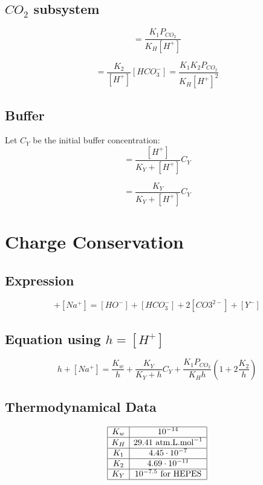 \documentclass[aps,12pt]{revtex4}
\begin{document}
\subsection{$CO_2$ subsystem}
\begin{equation}
[HCO_3^-] = \dfrac{K_1 P_{CO_2}}{K_H [H^+] } 
\end{equation}

\begin{equation}
[CO_3^{2-}] = \dfrac{K_2}{[H^+] }  [HCO_3^-]  = \dfrac{K_1 K_2 P_{CO_2}}{K_H [H^+]^2 } 
\end{equation}

\subsection{Buffer}
Let $C_Y$ be the initial buffer concentration:
\begin{equation}
	[HY] = \dfrac{[H^+]}{K_Y + [H^+]} C_Y
\end{equation}

\begin{equation}
	[Y^-] = \dfrac{K_Y}{K_Y + [H^+]} C_Y
\end{equation}

\section{Charge Conservation}

\subsection{Expression}

\begin{equation}
	[H^+] + [Na^+] = [HO^-] + [HCO_3^-] + 2[CO3^{2-}] + [Y^-]
\end{equation}

\subsection{Equation using $h=[H^+]$}

\begin{equation}
	h + [Na^+] = \dfrac{K_w}{h} + \dfrac{K_Y}{K_Y + h} C_Y + \dfrac{K_1 P_{CO_2}}{K_H h } \left( 1 + 2 \dfrac{K_2}{h} \right)
\end{equation}	

\subsection{Thermodynamical Data}

\begin{equation}
\begin{array}{|c|c|}
\hline
K_w & 10^{-14} \\
\hline
K_H & 29.41\text{ atm.L.mol}^{-1}\\
\hline
K_1 & 4.45 \cdot 10^{-7}\\
\hline
K_2 & 4.69 \cdot 10^{-11}\\
\hline
K_Y & 10^{-7.5} \text{ for HEPES}\\
\hline
\end{array}
\end{equation}
\end{document}

